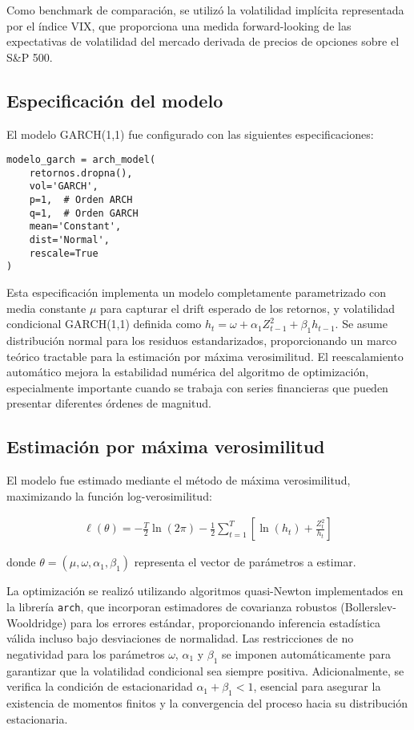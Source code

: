 Como benchmark de comparación, se utilizó la volatilidad implícita representada por el índice VIX, que proporciona una medida forward-looking de las expectativas de volatilidad del mercado derivada de precios de opciones sobre el S\&P 500.

\subsection{Especificación del modelo}

El modelo GARCH(1,1) fue configurado con las siguientes especificaciones:

\begin{verbatim}
modelo_garch = arch_model(
    retornos.dropna(),
    vol='GARCH',
    p=1,  # Orden ARCH
    q=1,  # Orden GARCH
    mean='Constant',
    dist='Normal',
    rescale=True
)
\end{verbatim}

Esta especificación implementa un modelo completamente parametrizado con media constante $\mu$ para capturar el drift esperado de los retornos, y volatilidad condicional GARCH(1,1) definida como $h_t = \omega + \alpha_1 Z_{t-1}^2 + \beta_1 h_{t-1}$. Se asume distribución normal para los residuos estandarizados, proporcionando un marco teórico tractable para la estimación por máxima verosimilitud. El reescalamiento automático mejora la estabilidad numérica del algoritmo de optimización, especialmente importante cuando se trabaja con series financieras que pueden presentar diferentes órdenes de magnitud.

\subsection{Estimación por máxima verosimilitud}

El modelo fue estimado mediante el método de máxima verosimilitud, maximizando la función log-verosimilitud:

\begin{align}
    \ell(\theta) = -\frac{T}{2}\ln(2\pi) - \frac{1}{2}\sum_{t=1}^{T}\left[\ln(h_t) + \frac{Z_t^2}{h_t}\right]
\end{align}

donde $\theta = (\mu, \omega, \alpha_1, \beta_1)$ representa el vector de parámetros a estimar.

La optimización se realizó utilizando algoritmos quasi-Newton implementados en la librería \texttt{arch}, que incorporan estimadores de covarianza robustos (Bollerslev-Wooldridge) para los errores estándar, proporcionando inferencia estadística válida incluso bajo desviaciones de normalidad. Las restricciones de no negatividad para los parámetros $\omega$, $\alpha_1$ y $\beta_1$ se imponen automáticamente para garantizar que la volatilidad condicional sea siempre positiva. Adicionalmente, se verifica la condición de estacionaridad $\alpha_1 + \beta_1 < 1$, esencial para asegurar la existencia de momentos finitos y la convergencia del proceso hacia su distribución estacionaria.

